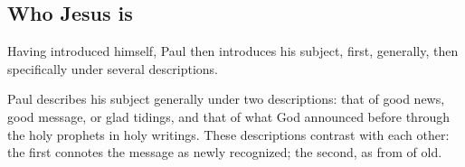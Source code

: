 \subsection{Who Jesus is}
Having introduced himself, Paul then introduces his subject, first, generally, then specifically under several descriptions. 

Paul describes his subject generally under two descriptions: that of good news, good message, or glad tidings, and that of what God announced before through the holy prophets in holy writings. These descriptions contrast with each other: the first connotes the message as newly recognized; the second, as from of old. 

